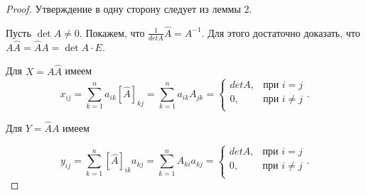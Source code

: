 \begin{proof}
    Утверждение в одну сторону следует из леммы 2.

    \bigskip
    Пусть $\det A \neq 0$. Покажем, что $\frac{1}{detA} \widehat{A} = A^{-1}$.
    Для этого достаточно доказать, что $A \widehat{A} = \widehat{A} A = \det A \cdot E$.

    Для $X = A \widehat{A}$ имеем
    \begin{equation*}
        x_{ij} = \sum_{k = 1}^n a_{ik} [\widehat{A}]_{kj} = \sum_{k = 1}^n a_{ik} A_{jk} = \begin{cases}
            detA, &\text{при }  i = j\\
            0, &\text{при } i \neq j \\
        \end{cases}
    .\end{equation*}

    Для $Y = \widehat{A} A$ имеем

    \begin{equation*}
        y_{ij} = \sum_{k = 1}^n [\widehat{A}]_{ik} a_{kj} = \sum_{k = 1}^n A_{ki} a_{kj} = \begin{cases}
            detA, &\text{при }  i = j \\
            0, &\text{при } i \neq j \\
        \end{cases}
    .\end{equation*}
\end{proof}
